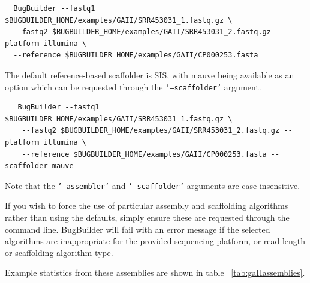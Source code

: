 \documentclass[a4paper,10pt]{article}
\begin{document}
\begin{verbatim}
  BugBuilder --fastq1 $BUGBUILDER_HOME/examples/GAII/SRR453031_1.fastq.gz \
  --fastq2 $BUGBUILDER_HOME/examples/GAII/SRR453031_2.fastq.gz --platform illumina \
  --reference $BUGBUILDER_HOME/examples/GAII/CP000253.fasta
\end{verbatim}

The default reference-based scaffolder is SIS, with mauve being available as an
option which can be requested through the {\tt '--scaffolder'} argument. 

\begin{verbatim}
   BugBuilder --fastq1 $BUGBUILDER_HOME/examples/GAII/SRR453031_1.fastq.gz \
    --fastq2 $BUGBUILDER_HOME/examples/GAII/SRR453031_2.fastq.gz --platform illumina \
    --reference $BUGBUILDER_HOME/examples/GAII/CP000253.fasta --scaffolder mauve
\end{verbatim}

Note that the {\tt '--assembler'} and {\tt '--scaffolder'} arguments are
case-insensitive. 

If you wish to force the use of particular assembly and scaffolding algorithms
rather than using the defaults, simply ensure these are requested through the
command line. BugBuilder will fail with an error message if the selected
algorithms are inappropriate for the provided sequencing platform, or read
length or scaffolding algorithm type.

Example statistics from these assemblies are shown in table ~\ref{tab:gaIIassemblies}.
\end{document}
